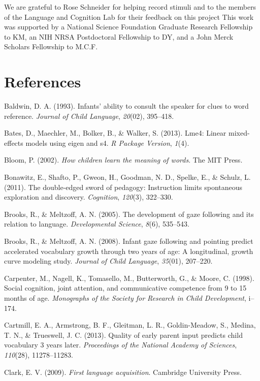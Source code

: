 \documentclass[authoryear, review]{elsarticle}
\begin{document}
We are grateful to Rose Schneider for helping record stimuli and to the
members of the Language and Cognition Lab for their feedback on this
project This work was supported by a National Science Foundation
Graduate Research Fellowship to KM, an NIH NRSA Postdoctoral Fellowship
to DY, and a John Merck Scholars Fellowship to M.C.F.

\newpage

\section*{References}\label{references}

Baldwin, D. A. (1993). Infants' ability to consult the speaker for clues
to word reference. \emph{Journal of Child Language}, \emph{20}(02),
395--418.

Bates, D., Maechler, M., Bolker, B., \& Walker, S. (2013). Lme4: Linear
mixed-effects models using eigen and s4. \emph{R Package Version},
\emph{1}(4).

Bloom, P. (2002). \emph{How children learn the meaning of words}. The
MIT Press.

Bonawitz, E., Shafto, P., Gweon, H., Goodman, N. D., Spelke, E., \&
Schulz, L. (2011). The double-edged sword of pedagogy: Instruction
limits spontaneous exploration and discovery. \emph{Cognition},
\emph{120}(3), 322--330.

Brooks, R., \& Meltzoff, A. N. (2005). The development of gaze following
and its relation to language. \emph{Developmental Science}, \emph{8}(6),
535--543.

Brooks, R., \& Meltzoff, A. N. (2008). Infant gaze following and
pointing predict accelerated vocabulary growth through two years of age:
A longitudinal, growth curve modeling study. \emph{Journal of Child
Language}, \emph{35}(01), 207--220.

Carpenter, M., Nagell, K., Tomasello, M., Butterworth, G., \& Moore, C.
(1998). Social cognition, joint attention, and communicative competence
from 9 to 15 months of age. \emph{Monographs of the Society for Research
in Child Development}, i--174.

Cartmill, E. A., Armstrong, B. F., Gleitman, L. R., Goldin-Meadow, S.,
Medina, T. N., \& Trueswell, J. C. (2013). Quality of early parent input
predicts child vocabulary 3 years later. \emph{Proceedings of the
National Academy of Sciences}, \emph{110}(28), 11278--11283.

Clark, E. V. (2009). \emph{First language acquisition}. Cambridge
University Press.
\end{document}
